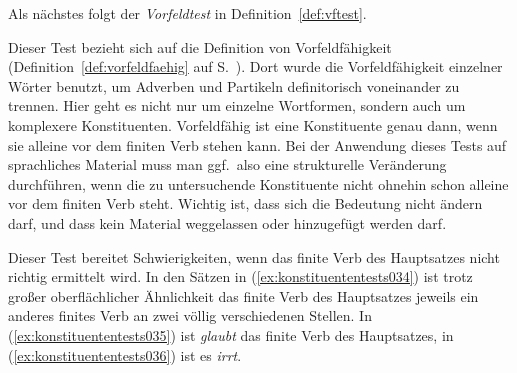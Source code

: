 Als nächstes folgt der \textit{Vorfeldtest} in Definition~\ref{def:vftest}.


Dieser Test bezieht sich auf die Definition von Vorfeldfähigkeit (Definition~\ref{def:vorfeldfaehig} auf S.~\pageref{def:vorfeldfaehig}).
Dort wurde die Vorfeldfähigkeit einzelner Wörter benutzt, um Adverben und Partikeln definitorisch voneinander zu trennen.
Hier geht es nicht nur um einzelne Wortformen, sondern auch um komplexere Konstituenten.
Vorfeldfähig ist eine Konstituente genau dann, wenn sie alleine vor dem finiten Verb stehen kann.
Bei der Anwendung dieses Tests auf sprachliches Material muss man ggf.\ also eine strukturelle Veränderung durchführen, wenn die zu untersuchende Konstituente nicht ohnehin schon alleine vor dem finiten Verb steht.
Wichtig ist, dass sich die Bedeutung nicht ändern darf, und dass kein Material weggelassen oder hinzugefügt werden darf.

\begin{exe}
  \ex\label{ex:konstituententests029}
  \begin{xlist}
  \end{xlist}
\end{exe}

Dieser Test bereitet Schwierigkeiten, wenn das finite Verb des Hauptsatzes nicht richtig ermittelt wird.
In den Sätzen in (\ref{ex:konstituententests034}) ist trotz großer oberflächlicher Ähnlichkeit das finite Verb des Hauptsatzes jeweils ein anderes finites Verb an zwei völlig verschiedenen Stellen.
In (\ref{ex:konstituententests035}) ist \textit{glaubt} das finite Verb des Hauptsatzes, in (\ref{ex:konstituententests036}) ist es \textit{irrt}.

